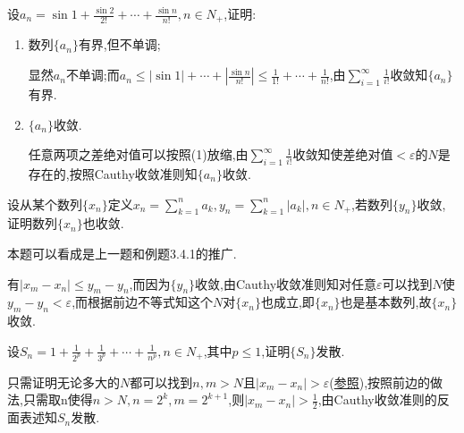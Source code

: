 \documentclass[cn,chinese,fontset]{elegantbook}
\begin{document}
            \begin{exercise}
                设$a_n=\sin1+\frac{\sin2}{2!}+\cdots+\frac{\sin n}{n!},n\in N_+$,证明:
                \begin{enumerate}
                    \item 数列$\{a_n\}$有界,但不单调;
                    \begin{solution}
                        显然$a_n$不单调;而$a_n\leqslant\left|\sin1\right|+\cdots+\left|\frac{\sin n}{n!}\right|\leqslant\frac{1}{1!}+\cdots+\frac{1}{n!}$,由$\sum_{i=1}^\infty\frac{1}{i!}$收敛知$\{a_n\}$有界.
                    \end{solution}
                    \item $\{a_n\}$收敛.
                    \begin{solution}
                        任意两项之差绝对值可以按照(1)放缩,由$\sum_{i=1}^\infty\frac{1}{i!}$收敛知使差绝对值$<\varepsilon$的$N$是存在的,按照Cauthy收敛准则知$\{a_n\}$收敛.
                    \end{solution}
                \end{enumerate}
            \end{exercise}

            \begin{exercise}
                设从某个数列$\{x_n\}$定义$x_n=\sum_{k=1}^na_k,y_n=\sum_{k=1}^n\left|a_k\right|,n\in N_+$,若数列$\{y_n\}$收敛,证明数列$\{x_n\}$也收敛.
                \begin{note}
                    本题可以看成是上一题和例题3.4.1的推广.
                \end{note}
            \end{exercise}
            \begin{solution}
                有$\left|x_m-x_n\right|\leqslant y_m-y_n$,而因为$\{y_n\}$收敛,由Cauthy收敛准则知对任意$\varepsilon$可以找到$N$使$y_m-y_n<\varepsilon$,而根据前边不等式知这个$N$对$\{x_n\}$也成立,即$\{x_n\}$也是基本数列,故$\{x_n\}$收敛.
            \end{solution}

            \begin{exercise}
                设$S_n=1+\frac{1}{2^p}+\frac{1}{3^p}+\cdots+\frac{1}{n^p},n\in N_+$,其中$p\leqslant 1$,证明$\{S_n\}$发散.
            \end{exercise}
            \begin{solution}
                只需证明无论多大的$N$都可以找到$n,m>N$且$\left|x_m-x_n\right|>\varepsilon$(\hyperlink{Cauthy}{参照}),按照前边的做法,只需取n使得$n>N,n=2^k,m=2^{k+1}$,则$\left|x_m-x_n\right|>\frac{1}{2}$,由Cauthy收敛准则的反面表述知$S_n$发散.
            \end{solution}
\end{document}
